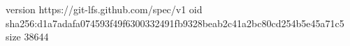 version https://git-lfs.github.com/spec/v1
oid sha256:d1a7adafa074593f49f6300332491fb9328beab2c41a2bc80cd254b5e45a71c5
size 38644
